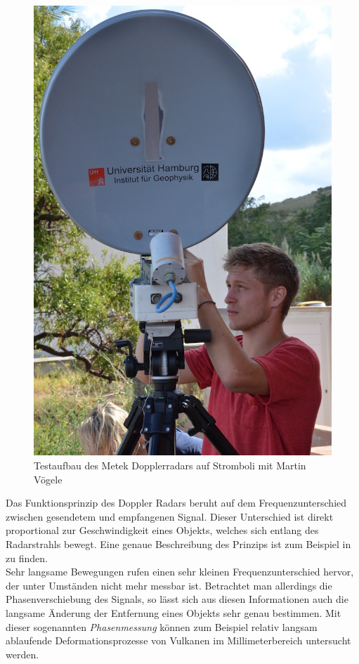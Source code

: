 \documentclass[12pt,a4paper,twoside,BCOR=12.5mm]{scrartcl}
\begin{document}
\begin{figure}[htb]
\centering
\includegraphics[scale=.3]{hardwareimages/radar.jpg}
\caption{Testaufbau des Metek Dopplerradars auf Stromboli mit Martin Vögele}
\label{radar}
\end{figure}

Das Funktionsprinzip des Doppler Radars beruht auf dem Frequenzunterschied zwischen gesendetem und empfangenen Signal. Dieser Unterschied ist direkt proportional zur Geschwindigkeit eines Objekts, welches sich entlang des Radarstrahls bewegt. Eine genaue Beschreibung des Prinzips ist zum Beispiel in \citep{Hort:2003fk} zu finden. \\

Sehr langsame Bewegungen rufen einen sehr kleinen Frequenzunterschied hervor, der unter Umständen nicht mehr messbar ist. Betrachtet man allerdings die Phasenverschiebung des Signals, so lässt sich aus diesen Informationen auch die langsame Änderung der Entfernung eines Objekts sehr genau bestimmen. 
Mit dieser sogenannten \textit{Phasenmessung} können zum Beispiel relativ langsam ablaufende Deformationsprozesse von Vulkanen im Millimeterbereich untersucht werden.
\end{document}
